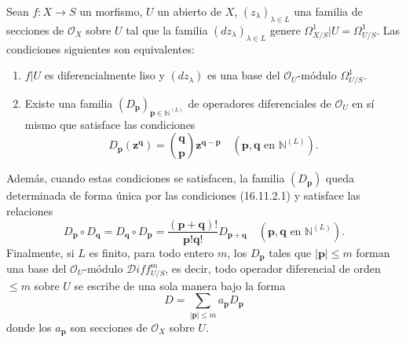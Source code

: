 \begin{theorem}[16.11.2]
\label{IV.16.11.2}
Sean $f:X\to S$ un morfismo, $U$ un abierto de $X$,
$(z_\lambda)_{\lambda\in L}$ una familia de secciones de $\mathcal{O}_X$
sobre $U$ tal que la familia $(dz_\lambda)_{\lambda\in L}$ genere
$\varOmega_{X/S}^1|U=\varOmega_{U/S}^1$. Las condiciones siguientes son
equivalentes:
\begin{enumerate}
  \item[\textup{a)}] $f|U$ es diferencialmente liso y $(dz_\lambda)$ es una base
  del $\mathcal{O}_U$-módulo $\varOmega_{U/S}^1$.
  \item[\textup{b)}] Existe una familia
  $(D_{\mathbf{p}})_{\mathbf{p}\in\mathbb{N}^{(L)}}$ de operadores
  diferenciales de $\mathcal{O}_U$ en sí mismo que satisface las condiciones
  \[
    D_{\mathbf{p}}(\mathbf{z}^{\mathbf{q}})
    =\binom{\mathbf{q}}{\mathbf{p}}
      \mathbf{z}^{\mathbf{q}-\mathbf{p}}
    \quad(\mathbf{p},\mathbf{q}\text{ en }\mathbb{N}^{(L)}).
    \tag{16.11.2.1}
    \label{IV.16.11.2.1}
  \]
\end{enumerate}
Además, cuando estas condiciones se satisfacen, la familia
$(D_{\mathbf{p}})$ queda determinada de forma única por las condiciones
\textup{(16.11.2.1)} y satisface las relaciones
\[
  D_{\mathbf{p}}\circ D_{\mathbf{q}}
  =D_{\mathbf{q}}\circ D_{\mathbf{p}}
  =\frac{(\mathbf{p}+\mathbf{q})!}{\mathbf{p}!\mathbf{q}!}
    D_{\mathbf{p}+\mathbf{q}}
  \quad(\mathbf{p},\mathbf{q}\text{ en }\mathbb{N}^{(L)}).
  \tag{16.11.2.2}
  \label{IV.16.11.2.2}
\]
Finalmente, si $L$ es finito, para todo entero $m$, los $D_{\mathbf{p}}$ tales que
$|\mathbf{p}|\leq m$ forman una base del $\mathcal{O}_U$-módulo
$\mathscr D\!iff_{U/S}^m$, es decir, todo operador diferencial
de orden $\leq m$ sobre $U$ se escribe de una sola manera bajo la forma
\[
  D=\sum_{|\mathbf{p}|\leq m}a_{\mathbf{p}}D_{\mathbf{p}}
\]
donde los $a_{\mathbf{p}}$ son secciones de $\mathcal{O}_X$ sobre
$U$.
\end{theorem}

